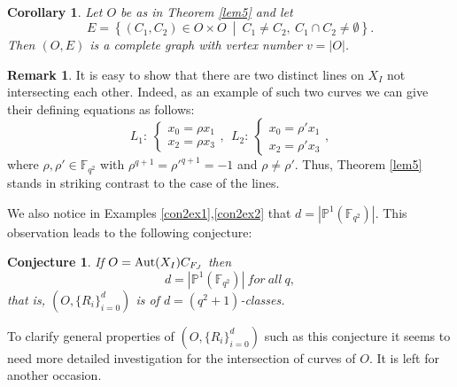 \documentclass[11pt]{amsart}
\newcommand{\lt}{{}^\mathrm t\hspace{-0.5mm}}
\theoremstyle{plain} %
\newtheorem{cor}[thm]{Corollary} %
\newtheorem*{conj}{Conjecture}
\theoremstyle{definition} %
\newtheorem{rem}[thm]{Remark} %
\theoremstyle{remark} %
\begin{document}
\begin{cor}
Let $O$ be as in Theorem \ref{lem5} and let
$$
E=\left\{(C_1,C_2)\in O\times O\ \middle\vert\ C_1\neq C_2,\ C_1\cap C_2\neq\emptyset \right\}.
$$
Then $(O,E)$ is a complete graph with vertex number $v=|O|$. %
\end{cor}
\begin{rem}
It is easy to show that there are two distinct lines on $X_I$ not intersecting each other. Indeed, as an example of such two curves we can give their defining equations as follows:
$$
L_1:\ \begin{cases}x_0=\rho x_1\\
x_2=\rho x_3
\end{cases}
,\ \ 
L_2:\ \begin{cases}x_0={\rho}'x_1\\
x_2={\rho}'x_3
\end{cases}
,
$$
where $\rho,{\rho}'\in\mathbb{F}_{q^2}$ with $\rho^{q+1}={{\rho}'}^{q+1}=-1$ and $\rho\neq{\rho}'$.
Thus, Theorem \ref{lem5} stands in striking contrast to the case of the lines.
\end{rem}
We also notice in Examples \ref{con2ex1},\ref{con2ex2} that
$d=|\mathbb{P}^1(\mathbb{F}_{q^2})|$. This observation leads to the following conjecture:
\begin{conj}\label{nin}
If $O={\rm Aut}(X_I)C_{F_J}$ then
$$d=|\mathbb{P}^1(\mathbb{F}_{q^2})|\ {for}\ {all}\ q,$$ 
that is, $\left(O,\{R_i\}_{i=0}^d\right)$ is of $d=(q^2+1)$-classes. %
\end{conj}
To clarify general properties of $\left(O,\{R_i\}_{i=0}^d\right)$ such as this conjecture it seems to need more detailed investigation for the intersection of curves of $O$. It is left for another occasion.
\end{document}
